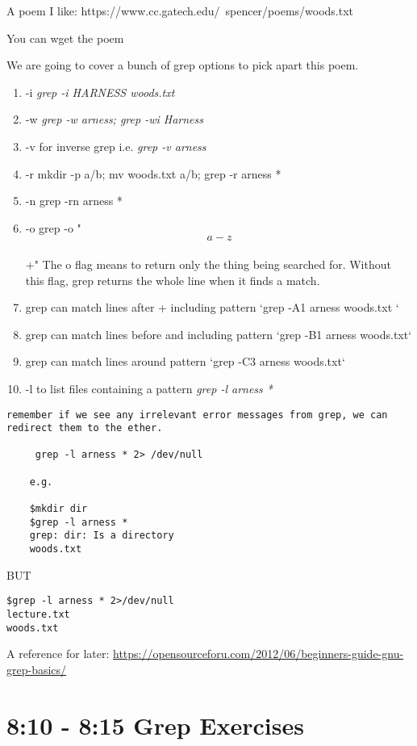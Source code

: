 \documentclass[12pt,a4paper]{article}
\begin{document}
A poem I like:
https://www.cc.gatech.edu/~spencer/poems/woods.txt

You can wget the poem

We are going to cover a bunch of grep options to pick apart this poem.

\begin{enumerate}
\item -i \textit{grep -i HARNESS woods.txt}
\item -w \textit{grep -w arness; grep -wi Harness} 
\item -v for inverse grep i.e. \textit{grep -v arness} 
\item -r mkdir -p a/b; mv woods.txt a/b; grep -r arness *
\item -n grep -rn arness *
\item -o grep -o "\[a-z\]\\+" The o flag means to return only the thing being
searched for. Without this flag, grep returns the whole line when it finds a
match.
\item grep can match lines after + including pattern `grep -A1 arness woods.txt `
\item grep can match lines before and including pattern  `grep -B1 arness woods.txt`
\item grep can match lines around pattern `grep -C3 arness woods.txt`
\item -l to list files containing a pattern \textit{ grep -l arness * }
\end{enumerate}

\begin{verbatim}
remember if we see any irrelevant error messages from grep, we can redirect them to the ether.

     grep -l arness * 2> /dev/null

    e.g.
    
	$mkdir dir
    $grep -l arness *
    grep: dir: Is a directory
    woods.txt
\end{verbatim}   
 
    BUT

\begin{lstlisting}[style=term]    
$grep -l arness * 2>/dev/null
lecture.txt
woods.txt
\end{lstlisting}

A reference for later:
\url{https://opensourceforu.com/2012/06/beginners-guide-gnu-grep-basics/}

\section{8:10 - 8:15 Grep Exercises}
 
\end{document}

